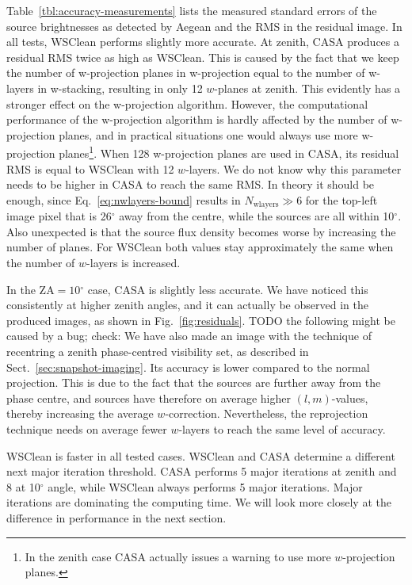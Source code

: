 \documentclass[useAMS,usenatbib]{mn2e}
\newcommand{\degree}{\ensuremath{^{\circ}}\xspace}
\begin{document}
Table~\ref{tbl:accuracy-measurements} lists the measured standard errors of the source brightnesses as detected by Aegean and the RMS in the residual image. In all tests, WSClean performs slightly more accurate. At zenith, CASA produces a residual RMS twice as high as WSClean. This is caused by the fact that we keep the number of w-projection planes in w-projection equal to the number of w-layers in w-stacking, resulting in only 12 $w$-planes at zenith. This evidently has a stronger effect on the w-projection algorithm. However, the computational performance of the w-projection algorithm is hardly affected by the number of w-projection planes, and in practical situations one would always use more w-projection planes\footnote{In the zenith case CASA actually issues a warning to use more $w$-projection planes.}. When 128 w-projection planes are used in CASA, its residual RMS is equal to WSClean with 12 $w$-layers. We do not know why this parameter needs to be higher in CASA to reach the same RMS. In theory it should be enough, since Eq.~\eqref{eq:nwlayers-bound} results in $N_\textrm{wlayers}\gg 6$ for the top-left image pixel that is 26\degree away from the centre, while the sources are all within 10\degree. Also unexpected is that the source flux density becomes worse by increasing the number of planes. For WSClean both values stay approximately the same when the number of $w$-layers is increased.

In the $\textrm{ZA}=10\degree$ case, CASA is slightly less accurate. We have noticed this consistently at higher zenith angles, and it can actually be observed in the produced images, as shown in Fig.~\ref{fig:residuals}. TODO the following might be caused by a bug; check: We have also made an image with the technique of recentring a zenith phase-centred visibility set, as described in Sect.~\ref{sec:snapshot-imaging}. Its accuracy is lower compared to the normal projection. This is due to the fact that the sources are further away from the phase centre, and sources have therefore on average higher $(l,m)$-values, thereby increasing the average $w$-correction. Nevertheless, the reprojection technique needs on average fewer $w$-layers to reach the same level of accuracy.

WSClean is faster in all tested cases. WSClean and CASA determine a different next major iteration threshold. CASA performs 5 major iterations at zenith and 8 at 10\degree angle, while WSClean always performs 5 major iterations. Major iterations are dominating the computing time. We will look more closely at the difference in performance in the next section.
\end{document}
